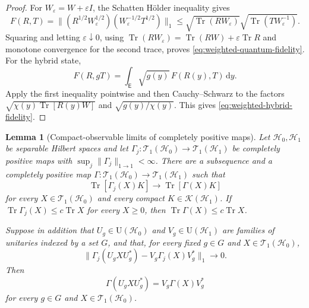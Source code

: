 \documentclass[11pt]{article}
\newtheorem{lemma}[lemma]{Lemma}
\theoremstyle{remark}
\theoremstyle{plain}
\newcommand{\cH}{\mathcal H}
\newcommand{\cT}{\mathcal T}
\newcommand{\U}{\mathrm U}
\newcommand{\dd}{\mathrm d}
\newcommand{\Tr}{\operatorname{Tr}}
\begin{document}
\begin{proof}
For \(W_\varepsilon=W+\varepsilon I\), the Schatten H\"older inequality gives
\[
  F(R,T)
  =\|(R^{1/2}W_\varepsilon^{1/2})(W_\varepsilon^{-1/2}T^{1/2})\|_1
  \le\sqrt{\Tr(RW_\varepsilon)}\sqrt{\Tr(TW_\varepsilon^{-1})}.
\]
Squaring and letting \(\varepsilon\downarrow0\), using
\(\Tr(RW_\varepsilon)=\Tr(RW)+\varepsilon\Tr R\) and monotone convergence
for the second trace, proves \eqref{eq:weighted-quantum-fidelity}.  For the
hybrid state,
\[
  F(R,gT)
  =\int_{\mathsf E}\sqrt{g(y)}\,F(R(y),T)\,\dd y.
\]
Apply the first inequality pointwise and then Cauchy--Schwarz to the factors
\(\sqrt{\chi(y)\Tr[R(y)W]}\) and
\(\sqrt{g(y)/\chi(y)}\).  This gives
\eqref{eq:weighted-hybrid-fidelity}.
\end{proof}

\begin{lemma}[Compact-observable limits of completely positive maps]
\label{lem:compact-cp-limit}
Let \(\cH_0,\cH_1\) be separable Hilbert spaces and let
\(\Gamma_j:\cT_1(\cH_0)\to\cT_1(\cH_1)\) be completely positive maps with
\(\sup_j\|\Gamma_j\|_{1\to1}<\infty\).  There are a subsequence and a
completely positive map
\(\Gamma:\cT_1(\cH_0)\to\cT_1(\cH_1)\) such that
\begin{equation}\label{eq:compact-map-convergence}
  \Tr[\Gamma_j(X)K]\longrightarrow\Tr[\Gamma(X)K]
\end{equation}
for every \(X\in\cT_1(\cH_0)\) and every compact
\(K\in\mathcal K(\cH_1)\).  If
\(\Tr\Gamma_j(X)\le c\Tr X\) for every \(X\ge0\), then
\(\Tr\Gamma(X)\le c\Tr X\).

Suppose in addition that
\(U_g\in\U(\cH_0)\) and \(V_g\in\U(\cH_1)\) are families of
unitaries indexed by a set \(G\), and that, for every fixed \(g\in G\) and
\(X\in\cT_1(\cH_0)\),
\[
  \|\Gamma_j(U_g X U_g^*)-V_g\Gamma_j(X)V_g^*\|_1
  \longrightarrow0.
\]
Then
\[
  \Gamma(U_g X U_g^*)=V_g\Gamma(X)V_g^*
\]
for every \(g\in G\) and \(X\in\cT_1(\cH_0)\).
\end{lemma}
\end{document}
